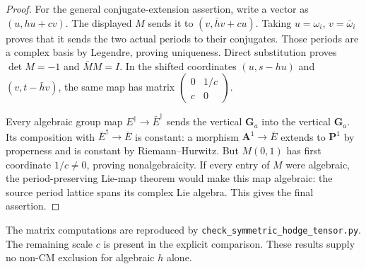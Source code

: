 \begin{proof}
For the general conjugate-extension assertion, write a vector as
$(u,hu+cv)$. The displayed $M$ sends it to
$(v,\bar h v+cu)$. Taking $u=\omega_i$, $v=\bar\omega_i$ proves
that it sends the two actual periods to their conjugates.
Those periods are a complex basis by Legendre, proving uniqueness.
Direct substitution proves $\det M=-1$ and $\bar M M=I$.
In the shifted coordinates $(u,s-hu)$ and $(v,t-\bar h v)$, the same
map has matrix
$\left(\begin{smallmatrix}0&1/c\\c&0\end{smallmatrix}\right)$.

Every algebraic group map $E^\dagger\to\bar E^\dagger$ sends the
vertical $\mathbf G_a$ into the vertical $\mathbf G_a$.
Its composition with $\bar E^\dagger\to\bar E$ is constant:
a morphism $\mathbf A^1\to\bar E$ extends to $\mathbf P^1$ by
properness and is constant by Riemann--Hurwitz. But $M(0,1)$ has
first coordinate $1/c\ne0$, proving nonalgebraicity.
If every entry of $M$ were algebraic, the period-preserving Lie-map
theorem \cite[Theorem 3.1, p.13 of the opened preprint]{EllBostCharles2016}
would make this map algebraic: the source period lattice spans its
complex Lie algebra. This gives the final assertion.
\end{proof}

The matrix computations are reproduced by
\texttt{check\_symmetric\_hodge\_tensor.py}. The remaining scale $c$
is present in the explicit comparison. These results supply no
non-CM exclusion for algebraic $h$ alone.
